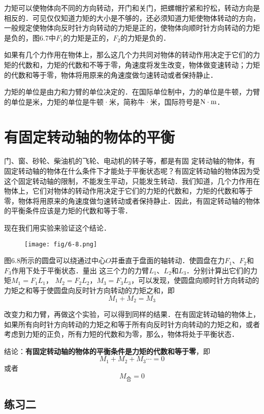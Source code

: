 力矩可以使物体向不同的方向转动，开门和关门，把螺帽拧紧和拧松，转动方向是相反的．可见仅仅知道力矩的大小是不够的，还必须知道力矩使物体转动的方向，一般规定使物体向反时针方向转动的力矩是正的，使物体向顺时针方向转动的力矩是负的，图6.7中$F_1$的力矩是正的，$F_2$的力矩是负的．

如果有几个力作用在物体上，那么这几个力共同对物体的转动作用决定于它们的力矩的代数和，力矩的代数和不等于零，角速度将发生改变，物体做变速转动；力矩的代数和等于零，物体将用原来的角速度做匀速转动或者保持静止．

力矩的单位是由力和力臂的单位决定的．在国际单位制中，力的单位是牛顿，力臂的单位是米，力矩的单位是牛顿·米，简称牛·米，国际符号是${\rm N\cdot m}$．

\section{有固定转动轴的物体的平衡}
门、窗、砂轮、柴油机的飞轮、电动机的转子等，都是有固
定转动轴的物体，有固定转动轴的物体在什么条件下才能处于平衡状态呢？有固定转动轴的物体因为受这个固定转动轴的限制，不能发生平动，只能发生转动．我们知道，几个力作用在物体上，它们对物体的转动作用决定于它们的力矩的代数和，力矩的代数和等于零，物体将用原来的角速度做匀速转动或者保持静止．因此，有固定转动轴的物体的平衡条件应该是力矩的代数和等于零．

现在我们用实验来验证这个结论．
\begin{figure}[htp]
\centering\texttt{[image: fig/6-8.png]}
\caption{}
\end{figure}

图6.8所示的圆盘可以绕通过中心$O$并垂直于盘面的轴转动．使圆盘在力$F_1$、$F_2$和$F_3$作用下处于平衡状态．量出
这三个力的力臂$L_1$、$L_2$和$L_3$．分别计算出它们的力矩$M_1 =F_1 L_1$， $M_2 =F_2 L_2$，$M_3 =F_3 L_3$，可以发现，使圆盘向顺时针方向转动的力矩之和等于使圆盘向反时针方向转动的力矩之和，即
\[M_1+M_2=M_3\]

改变力和力臂，再做这个实验，可以得到同样的结果．在有固定转动轴的物体上，如果所有向时针方向转动的力矩之和等于所有向反时针方向转动的力矩之和，或者考虑到力矩的正负，所有力短的代数和为零，那么，物体将处于平衡状态．

结论：\textbf{有固定转动轴的物体的平衡条件是力矩的代数和等于零}，即
\[M_1+M_2+M_3\cdots=0 \]
或者
\[M_{\text{合}}=0\]

\subsection*{练习二}

